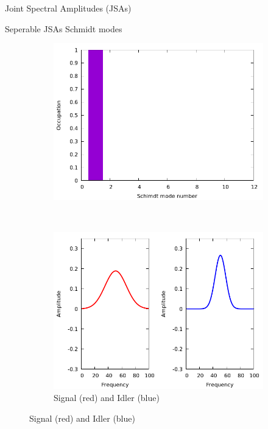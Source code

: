 \documentclass{beamer}
\begin{document}
\begin{frame}{Joint Spectral Amplitudes (JSAs)} 
    \centering
        \begin{figure}
        \end{figure}
    \end{frame}

    \begin{frame}{Seperable JSAs Schmidt modes}
        
    \begin{figure}
        \centering
    \begin{subfigure}{0.4\textwidth}
        \includegraphics[width=1\textwidth]{sepschmidtmodesocc.png}
    \end{subfigure}
    ~
    \begin{subfigure}{0.5\textwidth}
        \includegraphics[width=1\textwidth]{sepsingle_sig_idler1.png}
        \caption{Signal (red) and Idler (blue)}
        \end{subfigure}
    \end{figure}

\end{frame} 
\end{document}
